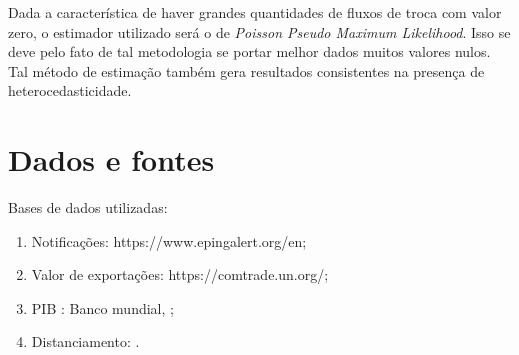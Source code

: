 \documentclass[12pt, a4paper]{article}
\begin{document}
Dada a característica de haver grandes quantidades de fluxos de troca com valor zero, o estimador utilizado será o de \emph{Poisson Pseudo Maximum Likelihood}. Isso se deve pelo fato de tal metodologia se portar melhor dados muitos valores nulos. Tal método de estimação também gera resultados consistentes na presença de heterocedasticidade.

\section{Dados e fontes}

Bases de dados utilizadas:

\begin{enumerate}
    \item Notificações: https://www.epingalert.org/en;
    \item Valor de exportações: https://comtrade.un.org/;
    \item PIB : Banco mundial, \cite{WB};
    \item Distanciamento: \cite{CEPII}.
\end{enumerate}

\printbibliography
\end{document}
